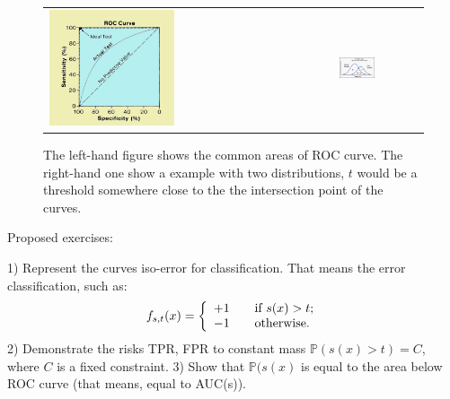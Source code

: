 			\begin{figure}
				\centering
				\begin{tabular}{l@{}l@{}}
			 		\includegraphics[width=0.45\textwidth]{inputs/img/roc_example} &
					\includegraphics[width=0.45\textwidth]{inputs/img/roc_intro1.png} \\
				\end{tabular}
				\caption{The left-hand figure shows the common areas of ROC curve. The right-hand one show a example with two distributions, $t$ would be a threshold somewhere close to the the intersection point of the curves.}
			  	\label{fig:chap1_scatters}
			\end{figure}

	     Proposed exercises:

	     1) Represent the curves iso-error for classification. That means the error classification, such as:	
			\[
			  f_{s,t}(x) = \left\{
			  \begin{array}{l l}
			    +1 & \quad \text{if $s(x)>t$;}\\
			    -1 & \quad \text{otherwise.}\\
			  \end{array} \right.
			\]
	     2) Demonstrate the risks TPR, FPR to constant mass $\mathbb{P}(s(x)>t)=C$, where $C$ is a fixed constraint.
	     3) Show that $\mathbb{P}(s(x)$ is equal to the area below ROC curve (that means, equal to AUC(s)).	
